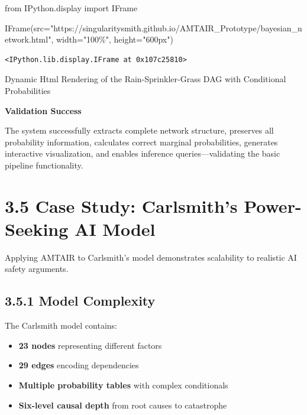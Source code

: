 \documentclass[
  11pt,
  letterpaper,
]{book}
\newenvironment{Shaded}{\begin{snugshade}}{\end{snugshade}}
\newcommand{\ImportTok}[1]{\textcolor[rgb]{0.00,0.46,0.62}{#1}}
\newcommand{\NormalTok}[1]{\textcolor[rgb]{0.00,0.23,0.31}{#1}}
\newcommand{\OperatorTok}[1]{\textcolor[rgb]{0.37,0.37,0.37}{#1}}
\newcommand{\StringTok}[1]{\textcolor[rgb]{0.13,0.47,0.30}{#1}}
\providecommand{\tightlist}{%
  \setlength{\itemsep}{0pt}\setlength{\parskip}{0pt}}
\begin{document}
\begin{landscape}
\begin{Shaded}
\begin{Highlighting}[]
\ImportTok{from}\NormalTok{ IPython.display }\ImportTok{import}\NormalTok{ IFrame}

\NormalTok{IFrame(src}\OperatorTok{=}\StringTok{"https://singularitysmith.github.io/AMTAIR\_Prototype/bayesian\_network.html"}\NormalTok{, width}\OperatorTok{=}\StringTok{"100\%"}\NormalTok{, height}\OperatorTok{=}\StringTok{"600px"}\NormalTok{)}
\end{Highlighting}
\end{Shaded}

\label{rain_sprinkler_grass_example_network_rendering2}
\begin{verbatim}
<IPython.lib.display.IFrame at 0x107c25810>
\end{verbatim}

Dynamic Html Rendering of the Rain-Sprinkler-Grass DAG with Conditional
Probabilities

\textbf{Validation Success}

The system successfully extracts complete network structure, preserves
all probability information, calculates correct marginal probabilities,
generates interactive visualization, and enables inference
queries---validating the basic pipeline functionality.

\section*{3.5 Case Study: Carlsmith's Power-Seeking AI
Model}\label{sec-case-carlsmith}


Applying AMTAIR to Carlsmith's model demonstrates scalability to
realistic AI safety arguments.

\subsection*{3.5.1 Model Complexity}\label{sec-carlsmith-complexity}

The Carlsmith model contains:

\begin{itemize}
\tightlist
\item
  \textbf{23 nodes} representing different factors
\item
  \textbf{29 edges} encoding dependencies
\item
  \textbf{Multiple probability tables} with complex conditionals
\item
  \textbf{Six-level causal depth} from root causes to catastrophe
\end{itemize}


\end{landscape}
\end{document}
